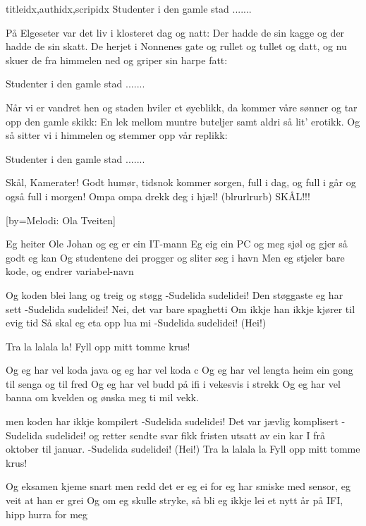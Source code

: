 \documentclass[14pt,letterpaper,norsk]{article}
\begin{document}
\begin{songs}{titleidx,authidx,scripidx}
\beginchorus
Studenter i den gamle stad .......
\endchorus

\beginverse
På Elgeseter var det liv i klosteret dag og natt:
Der hadde de sin kagge og der hadde de sin skatt.
De herjet i Nonnenes gate og rullet og tullet og datt,
og nu skuer de fra himmelen ned og griper sin harpe fatt:
\endverse

\beginchorus
Studenter i den gamle stad .......
\endchorus

\beginverse
Når vi er vandret hen og staden hviler et øyeblikk,
da kommer våre sønner og tar opp den gamle skikk:
En lek mellom muntre buteljer samt aldri så lit' erotikk.
Og så sitter vi i himmelen og stemmer opp vår replikk:
\endverse

\beginchorus
Studenter i den gamle stad .......
\endchorus

\endsong


\beginverse
Skål, Kamerater!  
Godt humør,   
tidsnok kommer sorgen,  
full i dag, og full i går  
og også full i morgen!  
Ompa ompa drekk deg i hjæl!  
(blrurlrurb) SKÅL!!!  
\endverse

\endsong

[by=Melodi: Ola Tveiten]

\beginverse
Eg heiter Ole Johan og eg er ein IT-mann
Eg eig ein PC og meg sjøl og gjer så godt eg kan
Og studentene dei progger og sliter seg i havn
Men eg stjeler bare kode, og endrer variabel-navn
\endverse

\beginchorus
Og koden blei lang og treig og støgg
-Sudelida sudelidei!
Den støggaste eg har sett
-Sudelida sudelidei!
Nei, det var bare spaghetti
Om ikkje han ikkje kjører til evig tid
Så skal eg eta opp lua mi
-Sudelida sudelidei! (Hei!)
\endchorus

\beginchorus
Tra la lalala la!
Fyll opp mitt tomme krus!
\endchorus

\beginverse
Og eg har vel koda java og eg har vel koda c
Og eg har vel lengta heim ein gong til senga og til fred
Og eg har vel budd på ifi i vekesvis i strekk
Og eg har vel banna om kvelden og ønska meg ti mil vekk.
\endverse

\beginchorus
men koden har ikkje kompilert
-Sudelida sudelidei!
Det var jævlig komplisert
-Sudelida sudelidei!
og retter sendte svar
fikk fristen utsatt av ein kar
I frå oktober til januar.
-Sudelida sudelidei! (Hei!)
Tra la lalala la
Fyll opp mitt tomme krus!
\endchorus

\beginverse
Og eksamen kjeme snart men redd det er eg ei
for eg har smiske med sensor, eg veit at han er grei
Og om eg skulle stryke, så bli eg ikkje lei
et nytt år på IFI, hipp hurra for meg
\endverse


\end{songs}
\end{document}
